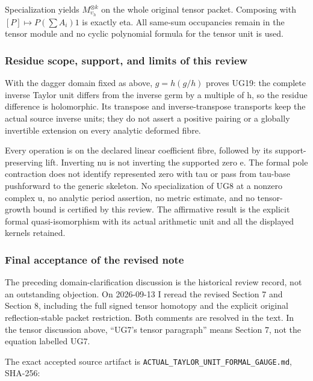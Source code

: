 \documentclass{article}
\begin{document}
Specialization yields \(M_{\upsilon_h}^{\otimes k}\) on the whole original tensor packet. Composing with \([P]\mapsto P(\sum A_i)1\) is exactly eta. All same-sum occupancies remain in the tensor module and no cyclic polynomial formula for the tensor unit is used.

\subsubsection{Residue scope, support, and limits of this review}\label{endpoint-f1_unit_gauge_review--residue-scope-support-and-limits-of-this-review}

With the dagger domain fixed as above, \(g=h(g/h)\) proves UG19: the complete inverse Taylor unit differs from the inverse germ by a multiple of h, so the residue difference is holomorphic. Its transpose and inverse-transpose transports keep the actual source inverse units; they do not assert a positive pairing or a globally invertible extension on every analytic deformed fibre.

Every operation is on the declared linear coefficient fibre, followed by its support-preserving lift. Inverting nu is not inverting the supported zero e. The formal pole contraction does not identify represented zero with tau or pass from tau-base pushforward to the generic skeleton. No specialization of UG8 at a nonzero complex u, no analytic period assertion, no metric estimate, and no tensor-growth bound is certified by this review. The affirmative result is the explicit formal quasi-isomorphism with its actual arithmetic unit and all the displayed kernels retained.

\subsubsection{Final acceptance of the revised note}\label{endpoint-f1_unit_gauge_review--final-acceptance-of-the-revised-note}

The preceding domain-clarification discussion is the historical review record, not an outstanding objection. On 2026-09-13 I reread the revised Section 7 and Section 8, including the full signed tensor homotopy and the explicit original reflection-stable packet restriction. Both comments are resolved in the text. In the tensor discussion above, ``UG7's tensor paragraph'' means Section 7, not the equation labelled UG7.

The exact accepted source artifact is \nolinkurl{ACTUAL_TAYLOR_UNIT_FORMAL_GAUGE.md}, SHA-256:
\end{document}
